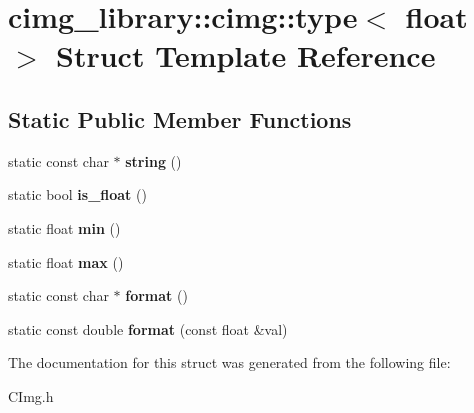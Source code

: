 \hypertarget{structcimg__library_1_1cimg_1_1type_3_01float_01_4}{\section{cimg\-\_\-library\-:\-:cimg\-:\-:type$<$ float $>$ Struct Template Reference}
\label{structcimg__library_1_1cimg_1_1type_3_01float_01_4}
}
\subsection*{Static Public Member Functions}
\begin{DoxyCompactItemize}
\item 
\hypertarget{structcimg__library_1_1cimg_1_1type_3_01float_01_4_a6f2657aedb2f0920ed0cf52495022f96}{static const char $\ast$ {\bfseries string} ()}\label{structcimg__library_1_1cimg_1_1type_3_01float_01_4_a6f2657aedb2f0920ed0cf52495022f96}

\item 
\hypertarget{structcimg__library_1_1cimg_1_1type_3_01float_01_4_aab9fc168d4a9fc82b39305345d8aaf33}{static bool {\bfseries is\-\_\-float} ()}\label{structcimg__library_1_1cimg_1_1type_3_01float_01_4_aab9fc168d4a9fc82b39305345d8aaf33}

\item 
\hypertarget{structcimg__library_1_1cimg_1_1type_3_01float_01_4_a126d41db37a309041f5f0efe567f088d}{static float {\bfseries min} ()}\label{structcimg__library_1_1cimg_1_1type_3_01float_01_4_a126d41db37a309041f5f0efe567f088d}

\item 
\hypertarget{structcimg__library_1_1cimg_1_1type_3_01float_01_4_a57df75d295606e7fa029422cadc95275}{static float {\bfseries max} ()}\label{structcimg__library_1_1cimg_1_1type_3_01float_01_4_a57df75d295606e7fa029422cadc95275}

\item 
\hypertarget{structcimg__library_1_1cimg_1_1type_3_01float_01_4_a6ce0b4cdee9bbb54af1eac89aae35b9d}{static const char $\ast$ {\bfseries format} ()}\label{structcimg__library_1_1cimg_1_1type_3_01float_01_4_a6ce0b4cdee9bbb54af1eac89aae35b9d}

\item 
\hypertarget{structcimg__library_1_1cimg_1_1type_3_01float_01_4_a6c58a05e32962f3c50a8e1738d9d2f7d}{static const double {\bfseries format} (const float \&val)}\label{structcimg__library_1_1cimg_1_1type_3_01float_01_4_a6c58a05e32962f3c50a8e1738d9d2f7d}

\end{DoxyCompactItemize}


The documentation for this struct was generated from the following file\-:\begin{DoxyCompactItemize}
\item 
C\-Img.\-h\end{DoxyCompactItemize}
